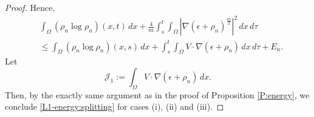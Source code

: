\documentclass{amsart}
\numberwithin{equation}{section}
\begin{document}
\begin{proof}
Hence, 
\begin{equation*}\label{eq 2 : Energy : splitting}
\begin{aligned}
&\int_{\Omega}\left(\rho_n\log \rho_n\right)(x,t)\,dx + \frac{4}{m}\int_{s}^{t}  \int_{\Omega}  \left | \nabla(\epsilon+\rho_n)^{\frac{m}{2}}\right |^2\,dx \,d\tau  \\
& \leq \int_{\Omega}\left(\rho_n\log \rho_n\right)(x,s)\,dx + \int_{s}^{t}  \int_{\Omega}  V\cdot \nabla (\epsilon+\rho_n) \,dx \,d\tau  + E_n.
\end{aligned}
\end{equation*}
Let 
\begin{equation*}
\mathcal{J}_1 :=\int_\Omega V\cdot \nabla(\epsilon +\rho_n) \,dx.
\end{equation*}
Then, by the exactly same argument as in the proof of Proposition \ref{P:energy}, we conclude \eqref{L1-energy:splitting} for cases  (i), (ii) and (iii).


\end{proof}
\end{document}
